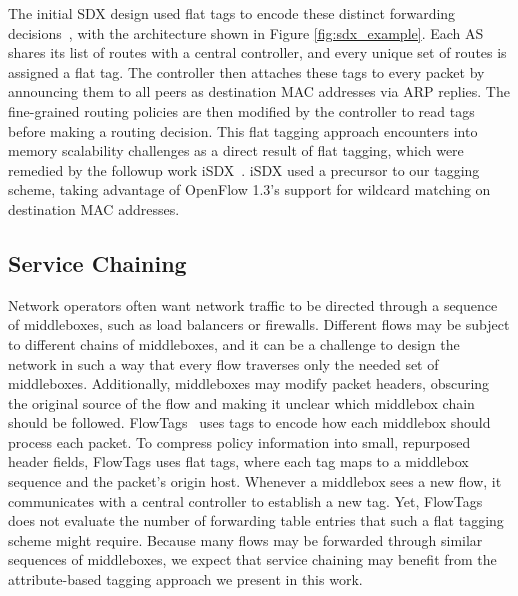The initial SDX design used flat tags to encode these distinct
forwarding decisions~\cite{sdx}, with the architecture shown in Figure \ref{fig:sdx_example}. Each AS shares its list of routes with
a central controller, and every unique set of routes is assigned a flat
tag. The controller then attaches these tags to every packet by
announcing them to all peers as destination MAC addresses via ARP
replies. The fine-grained routing policies are then modified by the
controller to read tags before making a routing decision.  This flat
tagging approach encounters into memory scalability challenges as a
direct result of flat tagging, which were remedied by the followup work
iSDX~\cite{isdx}. iSDX used a precursor to our tagging scheme, taking
advantage of OpenFlow 1.3's support for wildcard matching on destination
MAC addresses.

\subsection{Service Chaining}
Network operators often want network traffic to be directed through a
sequence of middleboxes, such as load balancers or firewalls.  Different
flows may be subject to different chains of middleboxes, and it can be a
challenge to design the network in such a way that every flow traverses
only the needed set of middleboxes. Additionally, middleboxes may modify
packet headers, obscuring the original source of the flow and making it
unclear which middlebox chain should be followed.
FlowTags~\cite{flowtags} uses tags to encode how each middlebox should
process each packet. To compress policy information into small,
repurposed header fields, FlowTags uses flat tags, where each tag maps
to a middlebox sequence and the packet's origin host. Whenever a
middlebox sees a new flow, it communicates with a central controller to
establish a new tag.  Yet, FlowTags does not evaluate the number of
forwarding table entries that such a flat tagging scheme might
require. Because many flows may be forwarded through similar sequences
of middleboxes, we expect that service chaining may benefit from the
attribute-based tagging approach we present in this work.
 

